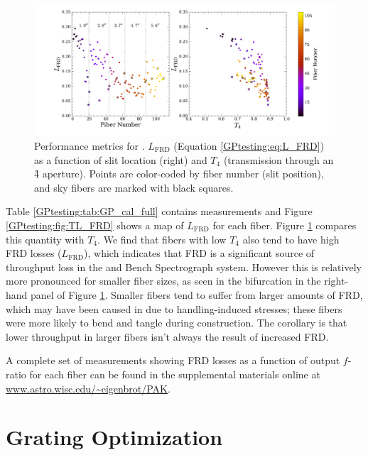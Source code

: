 \begin{figure}
  \centering
  \includegraphics[width=\textwidth]{Appendix/figs/gradpak_Lplots.pdf}
  \caption[\GP on-bench FRD
  losses]{\label{GPtesting:fig:FRD_loss}\fixspacing Performance
    metrics for \GP. $L_\mathrm{FRD}$ (Equation
    \ref{GPtesting:eq:L_FRD}) as a function of slit location (right)
    and $T_4$ (transmission through an \f4 aperture). Points are
    color-coded by fiber number (slit position), and sky fibers are
    marked with black squares.}
\end{figure}

Table \ref{GPtesting:tab:GP_cal_full} contains measurements and Figure
\ref{GPtesting:fig:TL_FRD} shows a map of $L_\mathrm{FRD}$ for each
\GP fiber. Figure \ref{GPtesting:fig:FRD_loss} compares this quantity
with $T_4$. We find that fibers with low $T_4$ also tend to have high
FRD losses ($L_\mathrm{FRD}$), which indicates that FRD is a
significant source of throughput loss in the \GP and Bench
Spectrograph system.  However this is relatively more pronounced for
smaller fiber sizes, as seen in the bifurcation in the right-hand
panel of Figure \ref{GPtesting:fig:FRD_loss}. Smaller fibers tend to
suffer from larger amounts of FRD, which may have been caused in \GP
due to handling-induced stresses; these fibers were more likely to
bend and tangle during construction.  The corollary is that lower
throughput in larger fibers isn't always the result of increased FRD.

A complete set of measurements showing FRD losses as a function of
output $f$-ratio for each fiber can be found in the supplemental
materials online at \url{www.astro.wisc.edu/~eigenbrot/PAK}.

% 




\chapter{Grating Optimization}
\label{chap:grating}

